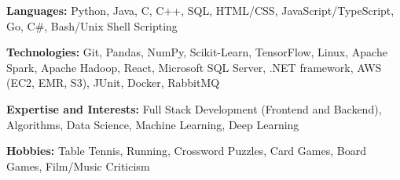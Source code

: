 	\textbf{Languages:} Python, Java, C, C++, SQL, HTML/CSS, JavaScript/TypeScript, Go, C\#, Bash/Unix Shell Scripting

	\textbf{Technologies:} Git, Pandas, NumPy, Scikit-Learn, TensorFlow, Linux, Apache Spark, Apache Hadoop, React, Microsoft SQL Server, .NET framework, AWS (EC2, EMR, S3), JUnit, Docker, RabbitMQ

	\textbf{Expertise and Interests:} Full Stack Development (Frontend and Backend), Algorithms, Data Science, Machine Learning, Deep Learning

	\textbf{Hobbies:} Table Tennis, Running, Crossword Puzzles, Card Games, Board Games, Film/Music Criticism

